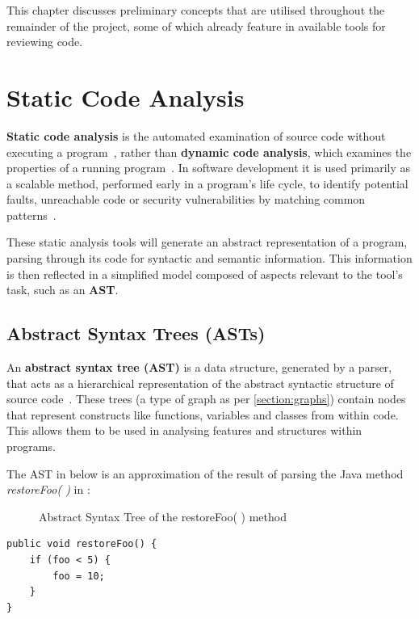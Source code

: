 \label{chapter:background}

This chapter discusses preliminary concepts that are utilised throughout the remainder of the project, some of which already feature in available tools for reviewing code. 

\section{Static Code Analysis}

\textbf{Static code analysis} is the automated examination of source code without executing a program~\cite{StaticCodeAnalysis}, rather than \textbf{dynamic code analysis}, which examines the properties of a running program~\cite{DynamicCodeAnalysis}. In software development it is used primarily as a scalable method, performed early in a program's life cycle, to identify potential faults, unreachable code or security vulnerabilities by matching common patterns~\cite{SCAVulnerabilities}.

These static analysis tools will generate an abstract representation of a program, parsing through its code for syntactic and semantic information. This information is then reflected in a simplified model composed of aspects relevant to the tool's task, such as an \textbf{AST}.

\subsection{Abstract Syntax Trees (ASTs)}

An \textbf{abstract syntax tree (AST)} is a data structure, generated by a parser, that acts as a hierarchical representation of the abstract syntactic structure of source code~\cite{ASTs}. These trees (a type of graph as per \cref{section:graphs}) contain nodes that represent constructs like functions, variables and classes from within code. This allows them to be used in analysing features and structures within programs.

The AST in  below is an approximation of the result of parsing the Java method \emph{restoreFoo( )} in :

\begin{figure}[H]
    \centering
    
    \caption{Abstract Syntax Tree of the restoreFoo( ) method}
    \label{fig:ast}
\end{figure}

\begin{listing}[H]
\begin{verbatim}
public void restoreFoo() {
    if (foo < 5) {
        foo = 10;
    }
}
\end{verbatim}
\caption{A simple Java function, \emph{restoreFoo}}
\label{lst:java_ast_example}
\end{listing}

